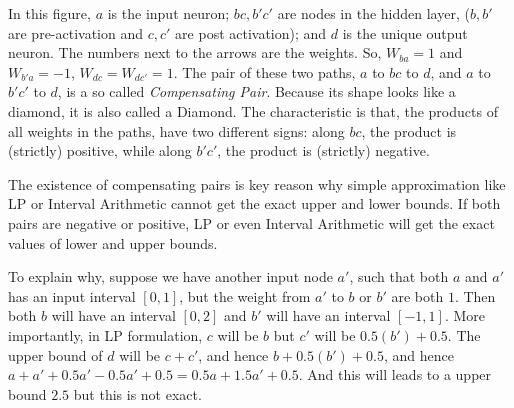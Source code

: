 \vspace*{2ex}

In this figure, $a$ is the input neuron; $bc,b'c'$ are nodes in the hidden layer, ($b,b'$ are pre-activation and $c,c'$ are post activation); and $d$ is the unique output neuron. The numbers next to the arrows are the weights. So, $W_{ba}=1$ and $W_{b'a}=-1$, $W_{dc}=W_{dc'}=1$. The pair of these two paths, $a$ to $bc$ to $d$, and $a$ to $b'c'$ to $d$, is a so called \emph{Compensating Pair}. Because its shape looks like a diamond, it is also called a Diamond. The characteristic is that, the products of all weights in the paths, have two different signs: along $bc$, the product is (strictly) positive, while along $b'c'$, the product is (strictly) negative. 

The existence of compensating pairs is key reason why simple approximation like LP or Interval Arithmetic cannot get the exact upper and lower bounds. If both pairs are negative or positive, LP or even Interval Arithmetic will get the exact values of lower and upper bounds.


To explain why, suppose we have another input node $a'$, such that both $a$ and $a'$ has an input interval $[0,1]$, but the weight from $a'$ to $b$ or $b'$ are both $1$. Then both $b$ will have an interval $[0,2]$ and $b'$ will have an interval $[-1,1]$. More importantly, in LP formulation, $c$ will be $b$ but $c'$ will be $0.5(b')+0.5$. The upper bound of $d$ will be $c+c'$, and hence $b+0.5(b')+0.5$, and hence $a+a'+0.5a'-0.5a'+0.5=0.5a+1.5a'+0.5$. And this will leads to a upper bound $2.5$ but this is not exact.

